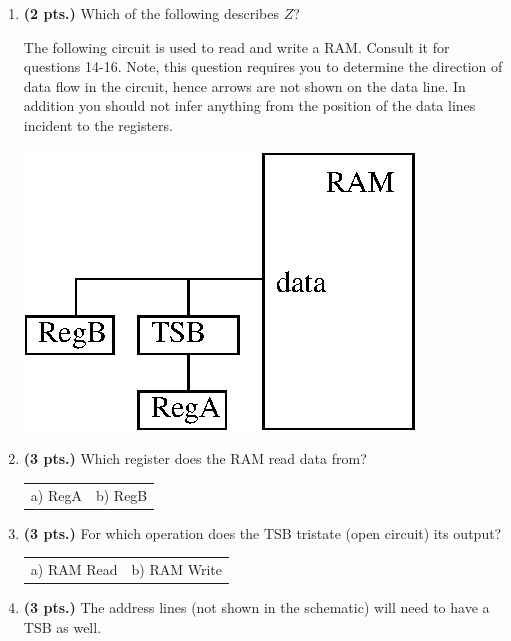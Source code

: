 \documentclass{article}
\begin{document}
\begin{enumerate}
\item {\bf (2 pts.)} Which of the following describes $Z$?


\pagebreak
The following circuit is used to read and write a RAM.
Consult it for questions 14-16.  Note, this question
requires you to determine the direction of data flow in 
the circuit, hence arrows are not shown on the data line.
In addition you should not infer anything from the position
of the data lines incident to the registers.

\includegraphics{./Fig3/ramtsb}

\item {\bf (3 pts.)} 
Which register does the RAM read data from?

\begin{tabular}{p{1.75in}p{1.75in}}
a) RegA & b) RegB \\
\end{tabular}


\item {\bf (3 pts.)} 
For which operation does the TSB tristate (open circuit) its output?

\begin{tabular}{p{1.75in}p{1.75in}}
a) RAM Read & b) RAM Write \\
\end{tabular}


\item {\bf (3 pts.)} 
The address lines (not shown in the schematic) will need to 
have a TSB as well.


\end{enumerate}
\end{document}
